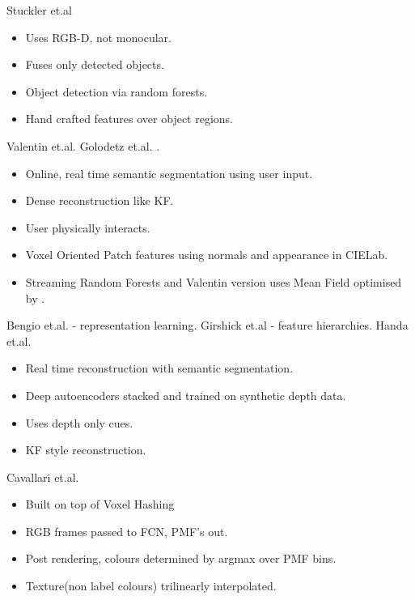 Stuckler et.al \cite{Stuckler2012} 
\begin{itemize}
	\item Uses RGB-D, not monocular.
	\item Fuses only detected objects.
	\item Object detection via random forests.
	\item Hand crafted features over object regions.
\end{itemize}

Valentin et.al. \cite{Valentin2015} Golodetz et.al. \cite{Golodetz2015}.
\begin{itemize}
	\item Online, real time semantic segmentation using user input.
	\item Dense reconstruction like KF.
	\item User physically interacts.
	\item Voxel Oriented Patch features using normals and appearance in CIELab.
	\item Streaming Random Forests\cite{Abdulsalam2007}  and Valentin version uses Mean Field \cite{Xing2002} optimised by \cite{Krahenbuhl2011}.
\end{itemize}

Bengio et.al. \cite{Bengio2013} - representation learning.
Girshick et.al \cite{Girshick2014} - feature hierarchies.
Handa et.al. \cite{Handa2015}
\begin{itemize}
	\item Real time reconstruction with semantic segmentation.
	\item Deep autoencoders stacked and trained on synthetic depth data.
	\item Uses depth only cues.
	\item KF style reconstruction.
\end{itemize}

Cavallari et.al. \cite{Cavallari2016}
\begin{itemize}
	\item Built on top of Voxel Hashing
	\item RGB frames passed to FCN\cite{Shelhamer2017}, PMF's out.
	\item Post rendering, colours determined by argmax over PMF bins.
	\item Texture(non label colours) trilinearly interpolated.
\end{itemize}

